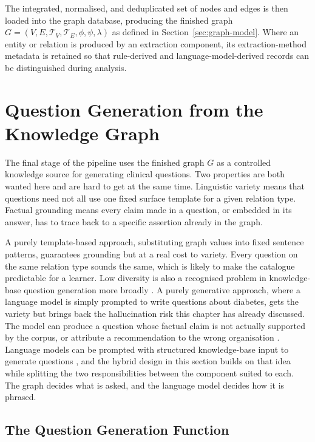 The integrated, normalised, and deduplicated set of nodes and edges is then loaded into the graph database, producing the finished graph $G = (V, E, \mathcal{T}_V, \mathcal{T}_E, \phi, \psi, \lambda)$ as defined in Section~\ref{sec:graph-model}. Where an entity or relation is produced by an extraction component, its extraction-method metadata is retained so that rule-derived and language-model-derived records can be distinguished during analysis.

\section{Question Generation from the Knowledge Graph}
\label{sec:questions}

The final stage of the pipeline uses the finished graph $G$ as a controlled knowledge source for generating clinical questions. Two properties are both wanted here and are hard to get at the same time. Linguistic variety means that questions need not all use one fixed surface template for a given relation type. Factual grounding means every claim made in a question, or embedded in its answer, has to trace back to a specific assertion already in the graph.

A purely template-based approach, substituting graph values into fixed sentence
patterns, guarantees grounding but at a real cost to variety. Every question on
the same relation type sounds the same, which is likely to make the catalogue
predictable for a learner. Low diversity is also a recognised problem in
knowledge-base question generation more broadly \cite{bi2020}.
A purely generative approach, where a language model is simply prompted to
write questions about diabetes, gets the variety but brings back the
hallucination risk this chapter has already discussed. The model can produce a
question whose factual claim is not actually supported by the corpus, or
attribute a recommendation to the wrong organisation \cite{huang2025}. Language
models can be prompted with structured knowledge-base input to generate
questions \cite{liang2023}, and the hybrid design in this section builds on
that idea while splitting the two responsibilities between the component suited
to each. The graph decides what is asked, and the language model decides how it
is phrased.
\subsection*{The Question Generation Function}

